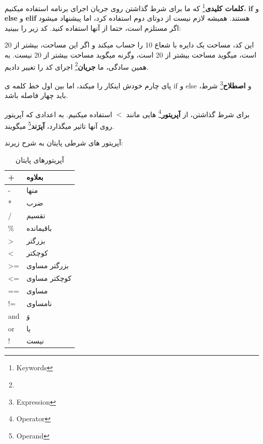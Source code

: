 \documentclass[14pt,a4paper]{memoir}
\begin{document}
	 \textbf{کلمات کلیدی}\footnote{Keywords} که ما برای شرط گذاشتن روی جریان اجرای برنامه استفاده میکنیم، \textbf{if} و \textbf{else} و \textbf{elif} هستند. همیشه لازم نیست از دوتای دوم استفاده کرد، اما پیشنهاد میشود اگر مستلزم است، حتما از آنها استفاده کنید. کد زیر را ببینید:
	 
	 
	 \begin{latin}
	
\end{latin} 
	 
	این کد، مساحت یک دایره با شعاع 10 را حساب میکند و  اگر این مساحت، بیشتر از 20 است، میگوید مساحت بیشتر از 20 است، وگرنه میگوید مساحت بیشتر از 20 نیست. به همین سادگی، ما \textbf{جریان}\footnote{} اجرای کد را تغییر دادیم. 
	
	\begin{tip}
		پای چارم خودش اینکار را میکند، اما بین اول خط کلمه ی if و else و \textbf{اصطلاح}\footnote{Expression} شرط، باید چهار \keys{\space} فاصله باشد.
	\end{tip}


برای شرط گذاشتن، از \textbf{آپریتور}\footnote{Operator} هایی مانند $ < $ استفاده میکنیم. به اعدادی که آپریتور روی آنها تاثیر میگذارد، \textbf{آپرَند}\footnote{Operand} میگویند.

آپریتور های شرطی پایتان به شرح زیرند:
	 
	 
	
	\begin{table}[H]\label{pyop}
		\centering
		\begin{tabular}{|l|l|}
			\hline
			+               & بعلاوه       \\ \hline
			-               & منها         \\ \hline
			*               & ضرب          \\ \hline
			/               & تقسیم        \\ \hline
			\%              & باقیمانده    \\ \hline
			\textgreater{}  & بزرگتر       \\ \hline
			\textless{}     & کوچکتر       \\ \hline
			\textgreater{}= & بزرگتر مساوی \\ \hline
			\textless{}=    & کوچکتر مساوی \\ \hline
			==              & مساوی        \\ \hline
			!=              & نامساوی     \\ \hline
			and             & وَ           \\ \hline
			or              & یا           \\ \hline
			!				& نیست \\ \hline
		\end{tabular}
		\caption{آپریتورهای پایتان}
	\end{table}
			
\end{document}

